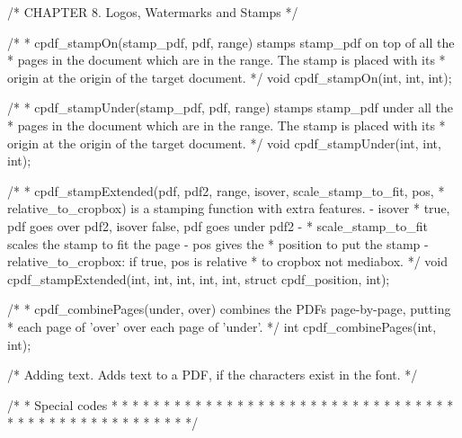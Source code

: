 /* CHAPTER 8. Logos, Watermarks and Stamps */

/*
 * cpdf_stampOn(stamp_pdf, pdf, range) stamps stamp_pdf on top of all the
 * pages in the document which are in the range. The stamp is placed with its
 * origin at the origin of the target document.
 */
void cpdf_stampOn(int, int, int);

/*
 * cpdf_stampUnder(stamp_pdf, pdf, range) stamps stamp_pdf under all the
 * pages in the document which are in the range. The stamp is placed with its
 * origin at the origin of the target document.
 */
void cpdf_stampUnder(int, int, int);

/*
 * cpdf_stampExtended(pdf, pdf2, range, isover, scale_stamp_to_fit, pos,
 * relative_to_cropbox) is a stamping function with extra features. - isover
 * true, pdf goes over pdf2, isover false, pdf goes under pdf2 -
 * scale_stamp_to_fit scales the stamp to fit the page - pos gives the
 * position to put the stamp - relative_to_cropbox: if true, pos is relative
 * to cropbox not mediabox.
 */
void cpdf_stampExtended(int, int, int, int, int, struct cpdf_position, int);

/*
 * cpdf_combinePages(under, over) combines the PDFs page-by-page, putting
 * each page of 'over' over each page of 'under'.
 */
int cpdf_combinePages(int, int);

/* Adding text. Adds text to a PDF, if the characters exist in the font. */

/*
 * Special codes
 *
 * %
 *
 * %
 *
 * %
 *
 * %
 *
 * %
 *
 * %
 *
 * %
 *
 * %
 *
 * %
 *
 * %
 *
 * %
 *
 * %
 *
 * %
 *
 * %
 *
 * %
 *
 * %
 *
 * %
 *
 * %
 *
 * %
 *
 * %
 *
 * %
 *
 * %
 *
 * %
 *
 * %
 *
 * %
 */

